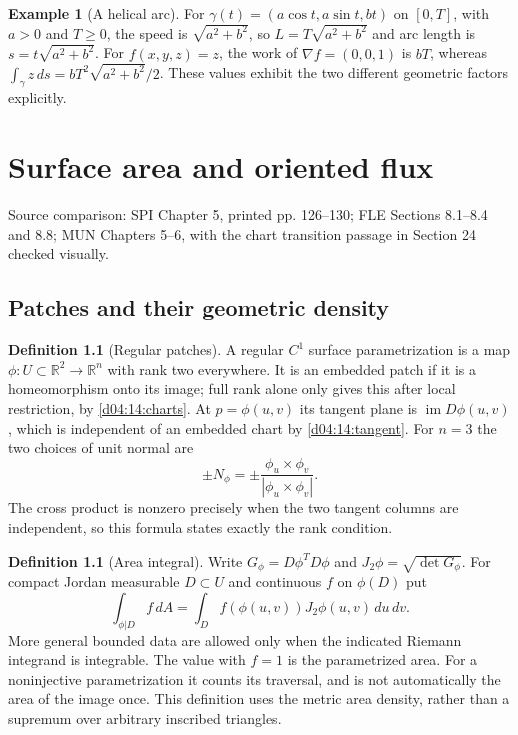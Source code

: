 \documentclass[11pt,oneside,openany]{book}
\theoremstyle{definition}
\newtheorem{definition}[theorem]{Definition}
\newtheorem{example}[theorem]{Example}
\theoremstyle{remark}
\newcommand{\R}{\mathbb R}
\newcommand{\family}[1]{}
\newcommand{\source}[1]{\par\begingroup\small\sffamily\color{black!65}Source comparison: #1\par\endgroup}
\begin{document}
\begin{example}[A helical arc]\label{d04:09:helix}
For $\gamma(t)=(a\cos t,a\sin t,bt)$ on $[0,T]$, with $a>0$ and $T\ge0$, the speed
is $\sqrt{a^2+b^2}$, so $L=T\sqrt{a^2+b^2}$ and arc length is
$s=t\sqrt{a^2+b^2}$. For $f(x,y,z)=z$, the work of $\nabla f=(0,0,1)$
is $bT$, whereas $\int_\gamma z\,ds=bT^2\sqrt{a^2+b^2}/2$.
These values exhibit the two different geometric factors explicitly.
\end{example}



\chapter{Surface area and oriented flux}
\label{ch:d04-10}
\source{SPI Chapter 5, printed pp. 126--130; FLE Sections 8.1--8.4 and 8.8; MUN Chapters 5--6, with the chart transition passage in Section 24 checked visually.}

\section{Patches and their geometric density}
\family{K04.10.01}\family{K04.10.02}\family{K04.10.03}
\begin{definition}[Regular patches]\label{d04:10:patch}
A regular $C^1$ surface parametrization is a map
$\phi:U\subset\R^2\to\R^n$ with rank two everywhere. It is an embedded
patch if it is a homeomorphism onto its image; full rank alone only gives
this after local restriction, by \cref{d04:14:charts}. At $p=\phi(u,v)$ its
tangent plane is $\operatorname{im}D\phi(u,v)$, which is independent of an
embedded chart by \cref{d04:14:tangent}. For $n=3$ the two choices of unit
normal are
\[
 \pm N_\phi=\pm\frac{\phi_u\times\phi_v}{|\phi_u\times\phi_v|}.
\]
The cross product is nonzero precisely when the two tangent columns are
independent, so this formula states exactly the rank condition.
\end{definition}

\begin{definition}[Area integral]\label{d04:10:area}
Write $G_\phi=D\phi^TD\phi$ and $J_2\phi=\sqrt{\det G_\phi}$.
For compact Jordan measurable $D\subset U$ and continuous $f$ on
$\phi(D)$ put
\[
 \int_{\phi|D} f\,dA=\int_D f(\phi(u,v))J_2\phi(u,v)\,du\,dv.
\]
More general bounded data are allowed only when the indicated Riemann
integrand is integrable. The value with $f=1$ is the parametrized area.
For a noninjective parametrization it counts its traversal, and is not
automatically the area of the image once. This definition uses the metric
area density, rather than a supremum over arbitrary inscribed triangles.
\end{definition}
\end{document}
